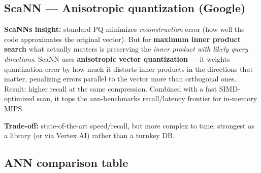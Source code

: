 \documentclass[11pt]{article}
\begin{document}
\subsection{ScaNN --- Anisotropic quantization (Google)}\label{scann--anisotropic-quantization-google}

\textbf{ScaNN\textquotesingle s insight:} standard PQ minimizes \emph{reconstruction} error (how well the code approximates the original vector). But for \textbf{maximum inner product search} what actually matters is preserving the \emph{inner product with likely query directions}. ScaNN uses \textbf{anisotropic vector quantization} --- it weights quantization error by how much it distorts inner products in the directions that matter, penalizing errors parallel to the vector more than orthogonal ones. Result: higher recall at the same compression. Combined with a fast SIMD-optimized scan, it tops the ann-benchmarks recall/latency frontier for in-memory MIPS.

\textbf{Trade-off:} state-of-the-art speed/recall, but more complex to tune; strongest as a library (or via Vertex AI) rather than a turnkey DB.

\subsection{ANN comparison table}\label{ann-comparison-table}
\end{document}
